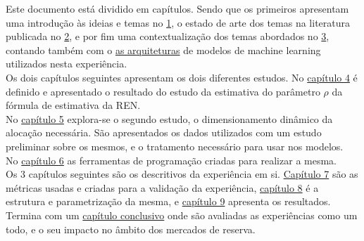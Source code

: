 Este documento está dividido em capítulos. Sendo que os primeiros apresentam uma introdução às ideias e temas no \hyperref[ch:intro]{1}, o estado de arte dos temas na literatura publicada no \hyperref[ch:revisao]{2}, e por fim uma contextualização dos temas abordados no \hyperref[ch:contexto]{3}, contando também com o \hyperref[se:arch]{as arquiteturas} de modelos de machine learning utilizados nesta experiência.\\
Os dois capítulos seguintes apresentam os dois diferentes estudos. No \hyperref[ch:estudo_1]{capítulo 4} é definido e apresentado o resultado do estudo da estimativa do parâmetro $\rho$ da fórmula de estimativa da \gls{REN}.\\
No \hyperref[ch:estudo_2]{capítulo 5} explora-se o segundo estudo, o dimensionamento dinâmico da alocação necessária. São apresentados os dados utilizados com um estudo preliminar sobre os mesmos, e o tratamento necessário para usar nos modelos.\\
No \hyperref[ch:ferramentas]{capítulo 6} as ferramentas de programação criadas para realizar a mesma.\\
Os 3 capítulos seguintes são os descritivos da experiência em si. \hyperref[ch:metricas]{Capítulo 7} são as métricas usadas e criadas para a validação da experiência, \hyperref[ch:metodos]{capítulo 8} é a estrutura e parametrização da mesma, e \hyperref[ch:resultados_discussao]{capítulo 9} apresenta os resultados.\\
Termina com um \hyperref[ch:conclusao]{capítulo conclusivo} onde são avaliadas as experiências como um todo, e o seu impacto no âmbito dos mercados de reserva.\\